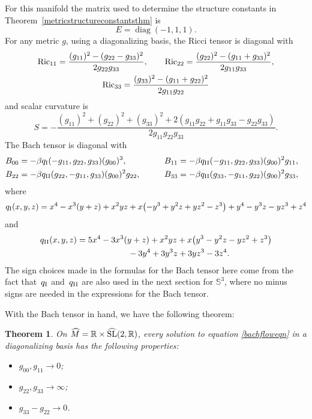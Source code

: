 \documentclass[pdftex]{sigma}
\numberwithin{equation}{section}
\newtheorem{Theorem}{Theorem}[section]
\newcommand{\diag}{\operatorname{diag}} %
\begin{document}
For this manifold the matrix used to determine the structure constants in Theorem~\ref{metricstructureconstantsthm} is
\[
E = \diag(-1, 1, 1).
\]
For any metric $g$, using a diagonalizing basis, the Ricci tensor is diagonal with
\begin{gather*}
{\rm Ric}_{11} = \frac{(g_{11})^2 - (g_{22} - g_{33})^2}{2 g_{22} g_{33}},\qquad
{\rm Ric}_{22} = \frac{(g_{22})^2 - (g_{11} + g_{33})^2}{2 g_{11} g_{33}},\\
{\rm Ric}_{33} = \frac{(g_{33})^2 - (g_{11} + g_{22})^2}{2 g_{11} g_{22}}
\end{gather*}
and scalar curvature is
\[
S = - \frac{(g_{11})^2 + (g_{22})^2+(g_{33})^2 + 2(g_{11} g_{22} + g_{11} g_{33} - g_{22} g_{33})}
		{2 g_{11} g_{22} g_{33}}.
\]
The Bach tensor is diagonal with
\begin{alignat*}{3}
& B_{00}= -\beta q_{\rm I}(-g_{11}, g_{22}, g_{33}) (g_{00})^3, \qquad &&
B_{11}= -\beta q_{\rm II}(-g_{11}, g_{22}, g_{33}) (g_{00})^2 g_{11},& \\
& B_{22}= -\beta q_{\rm II}(g_{22}, -g_{11}, g_{33}) (g_{00})^2 g_{22},\qquad &&
B_{33}= -\beta q_{\rm II}(g_{33}, -g_{11}, g_{22}) (g_{00})^2 g_{33},&
\end{alignat*}
where
\begin{gather*}
q_{\rm I}(x, y, z) = x^4 - x^3(y + z) + x^2yz
		 + x\big({-}y^3 + y^2z + yz^2 - z^3\big) + y^4 -y^3z -yz^3 + z^4
\end{gather*}
and
\begin{gather*}
q_{\rm II}(x, y, z) = 5x^4 - 3x^3(y + z) + x^2yz
 + x\big(y^3 - y^2z - yz^2 + z^3\big) \\
 \hphantom{q_{\rm II}(x, y, z) =}{} - 3y^4 + 3y^3z + 3yz^3 - 3z^4.
\end{gather*}
The sign choices made in the formulas for the Bach tensor here come from the fact that~$q_{\rm I}$ and~$q_{\rm II}$ are also used in the next section for $\mathbb{S}^3$, where no minus signs are needed in the expressions for the Bach tensor.

With the Bach tensor in hand, we have the following theorem:

\begin{Theorem} \label{sl2rthm}
On $\widehat{M} = \mathbb{R} \times \widehat{{\rm SL}}(2,\mathbb{R})$, every solution to equation \eqref{bachfloweqn} in a diagonalizing basis has the following properties:
\begin{itemize}\itemsep=0pt
\item $g_{00}, g_{11} \rightarrow 0$;
\item $g_{22}, g_{33} \rightarrow \infty$;
\item $g_{33} - g_{22} \rightarrow 0$.
\end{itemize}
\end{Theorem}
\end{document}
